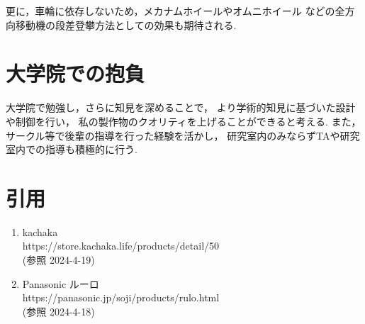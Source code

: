 \documentclass[dvipdfmx]{jsarticle}
\begin{document}
更に，車輪に依存しないため，メカナムホイールやオムニホイール
などの全方向移動機の段差登攀方法としての効果も期待される.
\section{大学院での抱負}
大学院で勉強し，さらに知見を深めることで，
より学術的知見に基づいた設計や制御を行い，
私の製作物のクオリティを上げることができると考える.
また，サークル等で後輩の指導を行った経験を活かし，
研究室内のみならずTAや研究室内での指導も積極的に行う.
\section{引用}
\begin{enumerate}
\renewcommand{\labelenumi}{[\arabic{enumi}]}
  \item kachaka\\
        https://store.kachaka.life/products/detail/50\\
        (参照 2024-4-19)
  \item Panasonic ルーロ\\
        https://panasonic.jp/soji/products/rulo.html\\
        (参照 2024-4-18)
  \end{enumerate}
\end{document}
